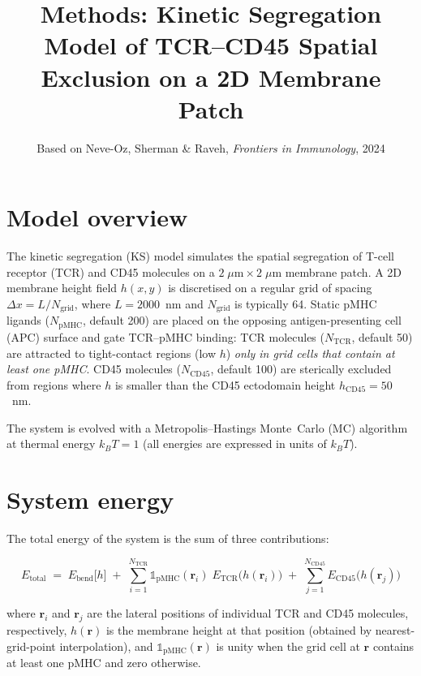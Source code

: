 \documentclass[11pt,a4paper]{article}
\title{Methods: Kinetic Segregation Model of TCR--CD45 Spatial
  Exclusion on a 2D Membrane Patch}
\author{Based on Neve-Oz, Sherman \& Raveh,
  \textit{Frontiers in Immunology}, 2024}
\date{}
\begin{document}
\maketitle

\section{Model overview}

The kinetic segregation (KS) model simulates the spatial segregation
of T-cell receptor (TCR) and CD45 molecules on a
$2\;\mu\text{m}\times2\;\mu\text{m}$ membrane patch.  A 2D membrane
height field $h(x,y)$ is discretised on a regular grid of spacing
$\Delta x = L / N_\text{grid}$, where $L=2000$~nm and
$N_\text{grid}$ is typically 64.  Static pMHC ligands
($N_\text{pMHC}$, default 200) are placed on the opposing
antigen-presenting cell (APC) surface and gate TCR--pMHC binding:
TCR molecules ($N_\text{TCR}$, default 50) are attracted to
tight-contact regions (low $h$) \emph{only in grid cells that
contain at least one pMHC}.  CD45 molecules ($N_\text{CD45}$,
default 100) are sterically excluded from regions where $h$ is
smaller than the CD45 ectodomain height
$h_\text{CD45}=50$~nm.

The system is evolved with a Metropolis--Hastings Monte~Carlo (MC)
algorithm at thermal energy $k_BT=1$ (all energies are expressed in
units of $k_BT$).


\section{System energy}

The total energy of the system is the sum of three contributions:

\begin{equation}
  \label{eq:total}
  E_\text{total}
  \;=\;
  E_\text{bend}\!\bigl[h\bigr]
  \;+\;
  \sum_{i=1}^{N_\text{TCR}}
    \mathbb{1}_\text{pMHC}(\mathbf{r}_i)\;
    E_\text{TCR}\!\bigl(h(\mathbf{r}_i)\bigr)
  \;+\;
  \sum_{j=1}^{N_\text{CD45}} E_\text{CD45}\!\bigl(h(\mathbf{r}_j)\bigr)
\end{equation}

\noindent
where $\mathbf{r}_i$ and $\mathbf{r}_j$ are the lateral positions of
individual TCR and CD45 molecules, respectively,
$h(\mathbf{r})$ is the membrane height at that position (obtained by
nearest-grid-point interpolation), and
$\mathbb{1}_\text{pMHC}(\mathbf{r})$ is unity when the grid cell at
$\mathbf{r}$ contains at least one pMHC and zero otherwise.
\end{document}
